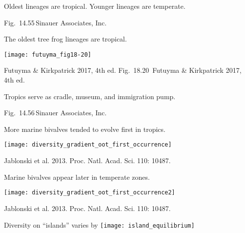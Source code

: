 \documentclass[t,handout]{beamer}  %
\newcommand{\futuyma}[1]{%
	\ifthenelse{\isempty{#1}}%
	{Futuyma \& Kirkpatrick 2017, 4th ed.}%
	{Fig.~#1~Futuyma \& Kirkpatrick 2017, 4th ed.}%
}
\newcommand{\backskip}{\vspace{-0.5\baselineskip}}
\begin{document}
{
\begin{frame}[t]{Oldest lineages are tropical. Younger lineages are temperate.}


	\vfilll

	\tiny \hfill Fig.~14.55\,\textcopyright Sinauer Associates, Inc.
\end{frame}
}


\begin{frame}{The oldest tree frog lineages are tropical.}


\centering

\texttt{[image: futuyma\_fig18-20]}
	
\tinyfill \futuyma{18.20}

\end{frame}

%
{
\begin{frame}[t]{Tropics serve as cradle, museum, and immigration pump.}


	\vfilll

	\tiny \hfill Fig.~14.56\,\textcopyright Sinauer Associates, Inc.
\end{frame}
}



\begin{frame}[t]{More marine bivalves tended to evolve first in tropics.}
	\begin{center}
		\texttt{[image: diversity\_gradient\_oot\_first\_occurrence]}
	\end{center}
	
	\vfilll
	
	\hfill \tiny Jablonski et al. 2013. Proc. Natl. Acad. Sci. 110: 10487.
\end{frame}
%
\begin{frame}[t]{Marine bivalves appear later in temperate zones.}
	\vspace{-\baselineskip}
	\begin{center}
		\texttt{[image: diversity\_gradient\_oot\_first\_occurrence2]}
	\end{center}
	
	\vfilll
	
	\hfill \tiny Jablonski et al. 2013. Proc. Natl. Acad. Sci. 110: 10487.
\end{frame}
%

\begin{frame}{Diversity on “islands” varies by }
	\centering
		\texttt{[image: island\_equilibrium]}
\end{frame}


\end{document}

